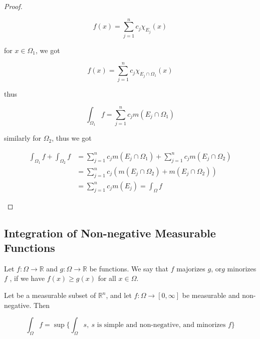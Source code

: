 \begin{proof}
\begin{enumerate}
        \[
            f(x) = \sum_{j=1}^{n} c_j \chi_{E_j}(x)
        \]

        for $x \in \Omega_1$, we got


        \[
            f(x) = \sum_{j=1}^{n} c_j \chi_{E_j \cap \Omega_1}(x)
        \]

        thus

        \[
            \int_{\Omega_1} f = \sum_{j=1}^{n}c_j m(E_j \cap \Omega_1)
        \]

        similarly for $\Omega_2$, thus we got

        \begin{align*}
            \int_{\Omega_1} f + \int_{\Omega_2} f&= \sum_{j=1}^{n}c_j m(E_j \cap \Omega_1) +  \sum_{j=1}^{n}c_j m(E_j \cap \Omega_2) \\
            &= \sum_{j=1}^{n}c_j \left(m(E_j \cap \Omega_2) + m(E_j \cap \Omega_2) \right)\\
            &= \sum_{j=1}^{n}c_j m(E_j)  = \int_{\Omega} f
        \end{align*}

    \end{enumerate}

\end{proof}

\subsection{Integration of Non-negative Measurable Functions}

\begin{definition}
    Let $f: \Omega \to \mathbb{R}$ and $g: \Omega \to \mathbb{R}$ be functions. We
say that $f$ majorizes $g$, or$g$ minorizes$f$ , if we have $f (x) \ge g(x)$ for all $x \in \Omega$.
\end{definition}

\begin{definition}
   Let be a measurable subset of $\mathbb{R}^n$, and let $f: \Omega \to [0,\infty]$ be measurable and non-negative. Then 

   \[
    \int_{\Omega} f = \sup \{ \int_{\Omega} s,\: s \text{ is simple and non-negative, and minorizes } f \}
   \]
\end{definition}

